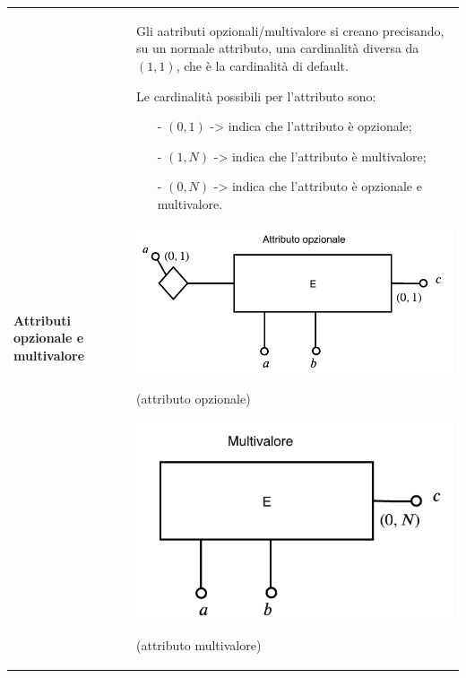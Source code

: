 \documentclass[a4paper, 10pt]{report}
\begin{document}
\begin{longtable}{| p{} | p{} |}
\textbf{Attributi opzionale e multivalore} & Gli aatributi opzionali/multivalore si creano precisando, su un normale attributo, una cardinalità diversa da $(1, 1)$, che  è la cardinalità di default.

Le cardinalità possibili per l'attributo sono:
\begin{itemize}
\item[-] $(0, 1)$ -> indica che l'attributo è opzionale;
\item[-] $(1, N)$ -> indica che l'attributo è multivalore;
\item[-] $(0, N)$ -> indica che l'attributo è opzionale e multivalore.
\end{itemize}

\begin{center}

\includegraphics[scale=0.5]{15ottobre05.pdf}

(attributo opzionale)

\includegraphics[scale=0.5]{15ottobre08.pdf}

(attributo multivalore)
\end{center}


\end{longtable}
\end{document}
